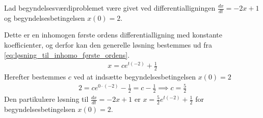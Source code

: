 \begin{eks} \textbf{} %
\newline
Lad begyndelsesværdiproblemet være givet ved differentialligningen $\frac{dx}{dt} = -2x+1$ og begyndelsesbetingelsen $x(0)=2$. 

Dette er en inhomogen første ordens differentialligning med konstante koefficienter, og derfor kan den generelle løsning bestemmes ud fra \eqref{eq:løsning_til_inhomo_første_ordens}.
%
\begin{align*}
    x = ce^{t(-2)} + \frac{1}{2}
\end{align*}
Herefter bestemmes $c$ ved at indsætte begyndelsesbetingelsen $x(0) = 2$
%
\begin{align*}
    2 = ce^{0\cdot(-2)} - \frac{1}{2} = c - \frac{1}{2} \implies c = \frac{5}{2}
\end{align*}
%
Den partikulære løsning til $\frac{dx}{dt} = -2x+1$ er $x=\frac{5}{2}e^{t(-2)} + \frac{1}{2}$ for begyndelsesbetingelsen $x(0)=2$.
\end{eks}